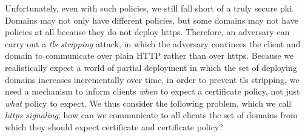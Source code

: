 

Unfortunately, even with such policies, we still fall short of a truly secure
\ac{pki}. Domains may not only have different policies, but some domains may not
have policies at all because they do not deploy \ac{https}. Therefore, an
adversary can carry out a \emph{\ac{tls} stripping} attack, in which the
adversary convinces the client and domain to communicate over plain HTTP rather
than over \ac{https}. Because we realistically expect a world of partial
deployment in which the set of deploying domains increases incrementally over
time, in order to prevent \ac{tls} stripping, we need a mechanism to inform
clients \emph{when} to expect a certificate policy, not just \emph{what} policy
to expect. We thus consider the following problem, which we call
\emph{\ac{https} signaling}: how can we communicate to all clients the set of
domains from which they should expect  certificate and certificate
policy?

